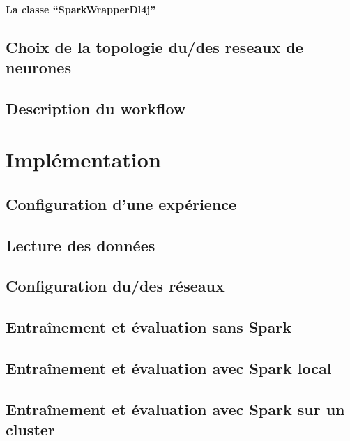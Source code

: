 \documentclass[a4paper,10pt,openany,oneside]{sphinxmanual}
\begin{document}
\subsubsection{La classe ``SparkWrapperDl4j''}
\label{index:la-classe-sparkwrapperdl4j}

\section{Choix de la topologie du/des reseaux de neurones}
\label{index:choix-de-la-topologie-du-des-reseaux-de-neurones}

\section{Description du workflow}
\label{index:description-du-workflow}

\chapter{Implémentation}
\label{index:implementation}

\section{Configuration d'une expérience}
\label{index:configuration-d-une-experience}

\section{Lecture des données}
\label{index:lecture-des-donnees}

\section{Configuration du/des réseaux}
\label{index:configuration-du-des-reseaux}

\section{Entraînement et évaluation sans Spark}
\label{index:entrainement-et-evaluation-sans-spark}

\section{Entraînement et évaluation avec Spark local}
\label{index:entrainement-et-evaluation-avec-spark-local}

\section{Entraînement et évaluation avec Spark sur un cluster}
\label{index:entrainement-et-evaluation-avec-spark-sur-un-cluster}
\end{document}

